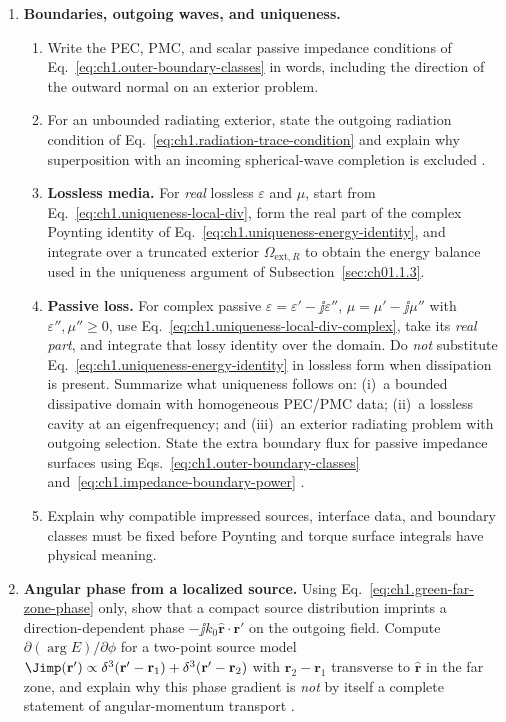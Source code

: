 \begin{enumerate}
\item \textbf{Boundaries, outgoing waves, and uniqueness.}
\begin{enumerate}[label=(\alph*)]
\item Write the PEC, PMC, and scalar passive impedance conditions of Eq.~\eqref{eq:ch1.outer-boundary-classes} in words, including the direction of the outward normal on an exterior problem.
\item For an unbounded radiating exterior, state the outgoing radiation condition of Eq.~\eqref{eq:ch1.radiation-trace-condition} and explain why superposition with an incoming spherical-wave completion is excluded \cite{sommerfeld1949}.
\item \textbf{Lossless media.} For \emph{real} lossless $\varepsilon$ and $\mu$, start from Eq.~\eqref{eq:ch1.uniqueness-local-div}, form the real part of the complex Poynting identity of Eq.~\eqref{eq:ch1.uniqueness-energy-identity}, and integrate over a truncated exterior $\Omega_{\mathrm{ext},R}$ to obtain the energy balance used in the uniqueness argument of Subsection~\ref{sec:ch01.1.3}.
\item \textbf{Passive loss.} For complex passive $\varepsilon=\varepsilon'-\jj\varepsilon''$, $\mu=\mu'-\jj\mu''$ with $\varepsilon'',\mu''\ge0$, use Eq.~\eqref{eq:ch1.uniqueness-local-div-complex}, take its \emph{real part}, and integrate that lossy identity over the domain. Do \emph{not} substitute Eq.~\eqref{eq:ch1.uniqueness-energy-identity} in lossless form when dissipation is present. Summarize what uniqueness follows on: (i)~a bounded dissipative domain with homogeneous PEC/PMC data; (ii)~a lossless cavity at an eigenfrequency; and (iii)~an exterior radiating problem with outgoing selection. State the extra boundary flux for passive impedance surfaces using Eqs.~\eqref{eq:ch1.outer-boundary-classes} and~\eqref{eq:ch1.impedance-boundary-power} \cite{stratton1941,harrington2001}.
\item Explain why compatible impressed sources, interface data, and boundary classes must be fixed before Poynting and torque surface integrals have physical meaning.
\end{enumerate}

\item \textbf{Angular phase from a localized source.}
Using Eq.~\eqref{eq:ch1.green-far-zone-phase} only, show that a compact source distribution imprints a direction-dependent phase $-\jj k_0\hat{\mathbf{r}}\cdot\mathbf{r}'$ on the outgoing field. Compute $\partial(\arg E)/\partial\phi$ for a two-point source model $\Jimp(\mathbf{r}')\propto\delta^3(\mathbf{r}'-\mathbf{r}_1)+\delta^3(\mathbf{r}'-\mathbf{r}_2)$ with $\mathbf{r}_2-\mathbf{r}_1$ transverse to $\hat{\mathbf{r}}$ in the far zone, and explain why this phase gradient is \emph{not} by itself a complete statement of angular-momentum transport \cite{stratton1941}.


\end{enumerate}
